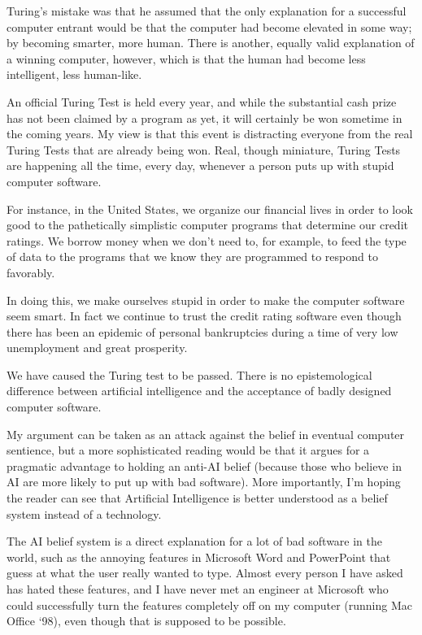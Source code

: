 \documentclass[letterpaper,12pt,english]{sphinxmanual}
\begin{document}
Turing's mistake was that he assumed that the only explanation for a successful computer entrant would be that the computer had become elevated in some way; by becoming smarter, more human. There is another, equally valid explanation of a winning computer, however, which is that the human had become less intelligent, less human-like.

An official Turing Test is held every year, and while the substantial cash prize has not been claimed by a program as yet, it will certainly be won sometime in the coming years. My view is that this event is distracting everyone from the real Turing Tests that are already being won. Real, though miniature, Turing Tests are happening all the time, every day, whenever a person puts up with stupid computer software.

For instance, in the United States, we organize our financial lives in order to look good to the pathetically simplistic computer programs that determine our credit ratings. We borrow money when we don't need to, for example, to feed the type of data to the programs that we know they are programmed to respond to favorably.

In doing this, we make ourselves stupid in order to make the computer software seem smart. In fact we continue to trust the credit rating software even though there has been an epidemic of personal bankruptcies during a time of very low unemployment and great prosperity.

We have caused the Turing test to be passed. There is no epistemological difference between artificial intelligence and the acceptance of badly designed computer software.

My argument can be taken as an attack against the belief in eventual computer sentience, but a more sophisticated reading would be that it argues for a pragmatic advantage to holding an anti-AI belief (because those who believe in AI are more likely to put up with bad software). More importantly, I'm hoping the reader can see that Artificial Intelligence is better understood as a belief system instead of a technology.

The AI belief system is a direct explanation for a lot of bad software in the world, such as the annoying features in Microsoft Word and PowerPoint that guess at what the user really wanted to type. Almost every person I have asked has hated these features, and I have never met an engineer at Microsoft who could successfully turn the features completely off on my computer (running Mac Office `98), even though that is supposed to be possible.
\end{document}
